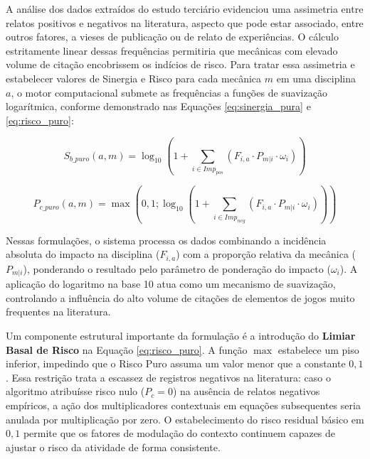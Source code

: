 A análise dos dados extraídos do estudo terciário evidenciou uma assimetria entre relatos positivos e negativos na literatura, aspecto que pode estar associado, entre outros fatores, a vieses de publicação ou de relato de experiências. O cálculo estritamente linear dessas frequências permitiria que mecânicas com elevado volume de citação encobrissem os indícios de risco. Para tratar essa assimetria e estabelecer valores de Sinergia e Risco para cada mecânica $m$ em uma disciplina $a$, o motor computacional submete as frequências a funções de suavização logarítmica, conforme demonstrado nas Equações \ref{eq:sinergia_pura} e \ref{eq:risco_puro}:

\begin{equation} \label{eq:sinergia_pura}
S_{b\_puro}(a, m) = \log_{10}\left(1 + \sum_{i \in Imp_{pos}} \left( F_{i,a} \cdot P_{m|i} \cdot \omega_{i} \right)\right)
\end{equation}

\begin{equation} \label{eq:risco_puro}
P_{c\_puro}(a, m) = \max \left( 0,1; \log_{10}\left(1 + \sum_{i \in Imp_{neg}} \left( F_{i,a} \cdot P_{m|i} \cdot \omega_{i} \right)\right) \right)
\end{equation}

Nessas formulações, o sistema processa os dados combinando a incidência absoluta do impacto na disciplina ($F_{i,a}$) com a proporção relativa da mecânica ($P_{m|i}$), ponderando o resultado pelo parâmetro de ponderação do impacto ($\omega_i$). A aplicação do logaritmo na base 10 atua como um mecanismo de suavização, controlando a influência do alto volume de citações de elementos de jogos muito frequentes na literatura.

Um componente estrutural importante da formulação é a introdução do \textbf{Limiar Basal de Risco} na Equação \ref{eq:risco_puro}. A função $\max$ estabelece um piso inferior, impedindo que o Risco Puro assuma um valor menor que a constante $0,1$. Essa restrição trata a escassez de registros negativos na literatura: caso o algoritmo atribuísse risco nulo ($P_c = 0$) na ausência de relatos negativos empíricos, a ação dos multiplicadores contextuais em equações subsequentes seria anulada por multiplicação por zero. O estabelecimento do risco residual básico em $0,1$ permite que os fatores de modulação do contexto continuem capazes de ajustar o risco da atividade de forma consistente.


